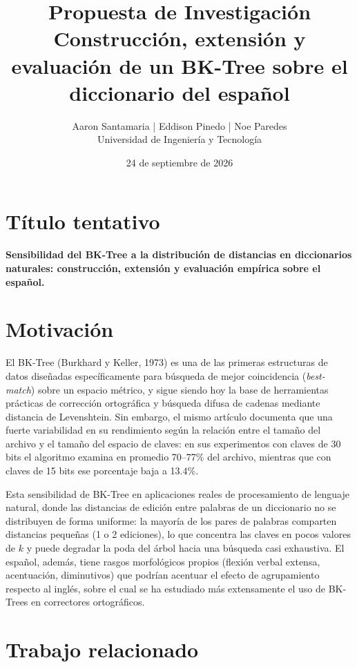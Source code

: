 \documentclass[11pt]{article}
\title{\textbf{Propuesta de Investigaci\'on} \\ \large Construcci\'on, extensi\'on y evaluaci\'on de un BK-Tree sobre el diccionario del espa\~nol}
\author{Aaron Santamaria | Eddison Pinedo | Noe Paredes \\ Universidad de Ingenier\'ia y Tecnolog\'ia}
\date{24 de septiembre de 2026}
\begin{document}
\maketitle

\section{T\'itulo tentativo}

\textbf{Sensibilidad del BK-Tree a la distribuci\'on de distancias en diccionarios naturales: construcci\'on, extensi\'on y evaluaci\'on emp\'irica sobre el espa\~nol.}

\section{Motivaci\'on}

El BK-Tree (Burkhard y Keller, 1973) es una de las primeras estructuras de datos dise\~nadas espec\'ificamente para b\'usqueda de mejor coincidencia (\emph{best-match}) sobre un espacio m\'etrico, y sigue siendo hoy la base de herramientas pr\'acticas de correcci\'on ortogr\'afica y b\'usqueda difusa de cadenas mediante distancia de Levenshtein. Sin embargo, el mismo art\'iculo  documenta que una fuerte variabilidad en su rendimiento seg\'un la relaci\'on entre el tama\~no del archivo y el tama\~no del espacio de claves: en sus experimentos con claves de 30 bits el algoritmo examina en promedio 70--77\% del archivo, mientras que con claves de 15 bits ese porcentaje baja a 13.4\%.

Esta sensibilidad de BK-Tree en aplicaciones reales de procesamiento de lenguaje natural, donde las distancias de edici\'on entre palabras de un diccionario no se distribuyen de forma uniforme: la mayor\'ia de los pares de palabras comparten distancias peque\~nas (1 o 2 ediciones), lo que concentra las claves en pocos valores de $k$ y puede degradar la poda del \'arbol hacia una b\'usqueda casi exhaustiva. El espa\~nol, adem\'as, tiene rasgos morfol\'ogicos propios (flexi\'on verbal extensa, acentuaci\'on, diminutivos) que podr\'ian acentuar el efecto de agrupamiento respecto al ingl\'es, sobre el cual se ha estudiado m\'as extensamente el uso de BK-Trees en correctores ortogr\'aficos.

\section{Trabajo relacionado}
\end{document}
